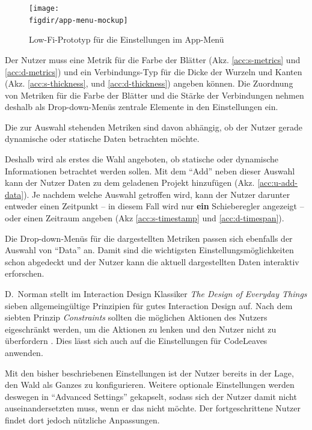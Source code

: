 \begin{figure}[htb]
  \texttt{[image: \\figdir/app-menu-mockup]}
  \caption{Low-Fi-Prototyp für die Einstellungen im App-Menü}
  \label{fig:settings}
\end{figure}

Der Nutzer muss eine Metrik für die Farbe der Blätter (Akz. \ref{acc:s-metrics} und \ref{acc:d-metrics}) und ein Verbindungs-Typ für die Dicke der Wurzeln und Kanten (Akz. \ref{acc:s-thickness},  und \ref{acc:d-thickness}) angeben können. Die Zuordnung von Metriken für die Farbe der Blätter und die Stärke der Verbindungen nehmen deshalb als Drop-down-Menüs zentrale Elemente in den Einstellungen ein.

Die zur Auswahl stehenden Metriken sind davon abhängig, ob der Nutzer gerade dynamische oder statische Daten betrachten möchte.

Deshalb wird als erstes die Wahl angeboten, ob statische oder dynamische Informationen betrachtet werden sollen. Mit dem "`Add"' neben dieser Auswahl kann der Nutzer Daten zu dem geladenen Projekt hinzufügen (Akz. \ref{acc:u-add-data}). Je nachdem welche Auswahl getroffen wird, kann der Nutzer darunter entweder einen Zeitpunkt -- in diesem Fall wird nur \textbf{ein} Schieberegler angezeigt -- oder einen Zeitraum angeben (Akz \ref{acc:s-timestamp} und \ref{acc:d-timespan}).

Die Drop-down-Menüs für die dargestellten Metriken passen sich ebenfalls der Auswahl von "`Data"' an. Damit sind die wichtigsten Einstellungsmöglichkeiten schon abgedeckt und der Nutzer kann die aktuell dargestellten Daten interaktiv erforschen.

D.\ Norman stellt im Interaction Design Klassiker \textit{The Design of Everyday Things} sieben allgemeingültige Prinzipien für gutes Interaction Design auf. Nach dem siebten Prinzip \textit{Constraints} sollten die möglichen Aktionen des Nutzers eigeschränkt werden, um die Aktionen zu lenken und den Nutzer nicht zu überfordern \cite{norman2013design}. Dies lässt sich auch auf die Einstellungen für CodeLeaves anwenden.

Mit den bisher beschriebenen Einstellungen ist der Nutzer bereits in der Lage, den Wald als Ganzes zu konfigurieren. Weitere optionale Einstellungen werden deswegen in "`Advanced Settings"' gekapselt, sodass sich der Nutzer damit nicht auseinandersetzten muss, wenn er das nicht möchte. Der fortgeschrittene Nutzer findet dort jedoch nützliche Anpassungen.

